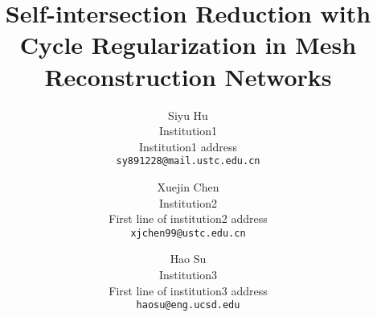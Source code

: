 \documentclass[10pt,twocolumn,letterpaper]{article}
\begin{document}
\title{Self-intersection Reduction with Cycle Regularization in Mesh Reconstruction Networks}

\author{Siyu Hu\\
Institution1\\
Institution1 address\\
{\tt\small sy891228@mail.ustc.edu.cn}
\and
Xuejin Chen\\
Institution2\\
First line of institution2 address\\
{\tt\small xjchen99@ustc.edu.cn}
\and 
Hao Su\\
Institution3\\
First line of institution3 address\\
{\tt\small haosu@eng.ucsd.edu}
}

\maketitle
 





{\small


}

%
\end{document}
